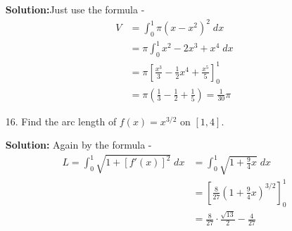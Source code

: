 \documentclass[11pt,reqno]{article}
\theoremstyle{definition}
\begin{document}
\begin{enumerate}
		\textbf{Solution:}Just use the formula -
		\begin{align*}
			V &= \int_{0}^{1} \pi (x - x^2)^2 \; dx \\
			&= \pi \int_{0}^{1} x^2 - 2x^3 + x^4 \; dx \\
			&= \pi \left[ \frac{x^3}{3} - \frac{1}{2} x^4 + \frac{x^5}{5} \right]_{0}^{1} \\
			&= \pi \left(\frac{1}{3} - \frac{1}{2} + \frac{1}{5}\right) = \frac{1}{30} \pi
		\end{align*}
		\newpage
		\item[16.] Find the arc length of $f(x) = x^{3/2}$ on $[1,4]$. 
		
		\textbf{Solution:} Again by the formula - 
		\begin{align*}
			L = \int_{0}^{1} \sqrt{1 + [f'(x)]^2 } \; dx &= \int_{0}^{1} \sqrt{1 + \frac{9}{4} x} \; dx \\
			&= \left[\frac{8}{27} \left(1 + \frac{9}{4} x\right)^{3/2}\right]_{0}^{1} \\
			&= \frac{8}{27} \cdot \frac{\sqrt{13}}{{2}} - \frac{4}{27}
		\end{align*}
	\end{enumerate}
	

	
	
\end{document}
